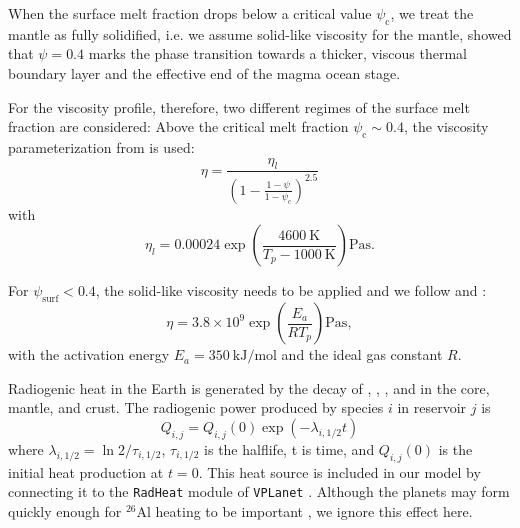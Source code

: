 \documentclass[paper=letterpaper,fontsize=12pt,oneside,twocolumn]{article}
\newcommand{\vplanet}{\texttt{\footnotesize{VPLanet}}}
\newcommand{\radheat}{\texttt{\footnotesize{RadHeat}}}
\begin{document}
When the surface melt fraction drops below a critical value $\psi_\mathrm{c}$, we treat the mantle as fully solidified, i.e. we assume solid-like viscosity for the mantle, 
\citet{Lebrun2013} showed that $\psi = 0.4$ marks the phase transition towards a thicker, viscous thermal boundary layer and the effective end of the magma ocean stage. 

For the viscosity profile, therefore, two different regimes of the surface melt fraction are considered:
Above the critical melt fraction $\psi_\mathrm{c} \sim 0.4$, the viscosity parameterization from \citet{Lebrun2013} is used:
\begin{equation}
\label{eta_liq}
\eta = \frac{\eta_l}{\left( 1 - \frac{1-\psi}{1-\psi_\mathrm{c}}\right)^{2.5}}
\end{equation}
with
\begin{equation}
\eta_l = 0.00024 \exp \left( \frac{\SI{4600}{\kelvin}}{T_p - \SI{1000}{\kelvin}} \right) \si{\pascal\second}.
\end{equation}

For $\psi_\mathrm{surf} < 0.4$, the solid-like viscosity needs to be applied and we follow \citet{Lebrun2013} and \citet{Schaefer2016}:
\begin{equation}
\eta = 3.8 \times 10^9 \exp \left( \frac{E_a}{R T_p} \right) \si{\pascal\second},
\end{equation}
with the activation energy $E_a = \SI{350}{\kilo\joule\per\mole}$ and the ideal gas constant $R$.

Radiogenic heat in the Earth is generated by the decay of , , , and  in the core, mantle, and crust.
The radiogenic power produced by species $i$ in reservoir $j$ is
\begin{equation}
	Q_{i,j}=Q_{i,j}(0)\exp(-\lambda_{i,1/2}t)
	\label{radiogenicheat}
\end{equation}
where $\lambda_{i,1/2}=\ln 2/\tau_{i,1/2}$, $\tau_{i,1/2}$ is the halflife, t is time, and $Q_{i,j}(0)$ is the initial heat production at $t=0$.
This heat source is included in our model by connecting it to the \radheat{} module of \vplanet{} \citep{Barnes2020}. Although the planets may form quickly enough for $^{26}$Al heating to be important \citep{Barnes2016,Lichtenberg2019}, we ignore this effect here.
\end{document}
